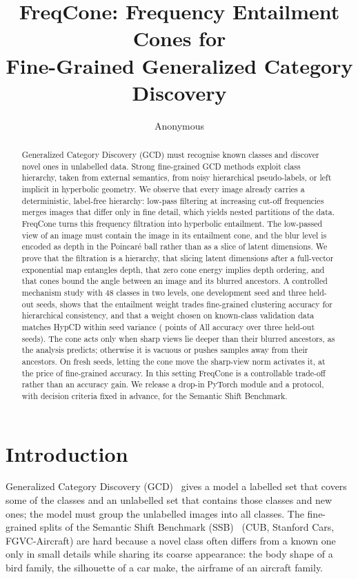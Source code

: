 \documentclass[10pt]{article}
\title{FreqCone: Frequency Entailment Cones for\\ Fine-Grained Generalized Category Discovery}
\author{Anonymous}
\date{}
\begin{document}
\maketitle

\begin{abstract}
Generalized Category Discovery (GCD) must recognise known classes and discover novel ones in unlabelled data.
Strong fine-grained GCD methods exploit class hierarchy, taken from external semantics, from noisy hierarchical
pseudo-labels, or left implicit in hyperbolic geometry. We observe that every image already carries a
deterministic, label-free hierarchy: low-pass filtering at increasing cut-off frequencies merges images that
differ only in fine detail, which yields nested partitions of the data. FreqCone turns this frequency
filtration into hyperbolic entailment. The low-passed view of an image must contain the image in its
entailment cone, and the blur level is encoded as depth in the Poincar\'e ball rather than as a slice of
latent dimensions. We prove that the filtration is a hierarchy, that slicing latent dimensions after a
full-vector exponential map entangles depth, that zero cone energy implies depth ordering, and that cones bound
the angle between an image and its blurred ancestors. A controlled mechanism study with 48 classes in two
levels, one development seed and three held-out seeds, shows that the entailment weight trades fine-grained
clustering accuracy for hierarchical consistency, and that a weight chosen on known-class validation data
matches HypCD within seed variance (\dAllSel{} points of All accuracy over three held-out seeds). The cone acts
only when sharp views lie deeper than their blurred ancestors, as the analysis predicts; otherwise it is vacuous
or pushes samples away from their ancestors. On fresh seeds, letting the cone move the sharp-view norm activates
it, at the price of fine-grained accuracy. In this setting FreqCone is a controllable trade-off rather than an
accuracy gain.
We release a drop-in PyTorch module and a protocol, with decision criteria fixed in advance, for the
Semantic Shift Benchmark.
\end{abstract}

\section{Introduction}
Generalized Category Discovery (GCD)~\cite{vaze2022gcd} gives a model a labelled set that covers some of the
classes and an unlabelled set that contains those classes and new ones; the model must group the unlabelled
images into all classes. The fine-grained splits of the Semantic Shift Benchmark (SSB)~\cite{vaze2022ssb}
(CUB, Stanford Cars, FGVC-Aircraft) are hard because a novel class often differs from a known one only in
small details while sharing its coarse appearance: the body shape of a bird family, the silhouette of a car
make, the airframe of an aircraft family.
\end{document}
